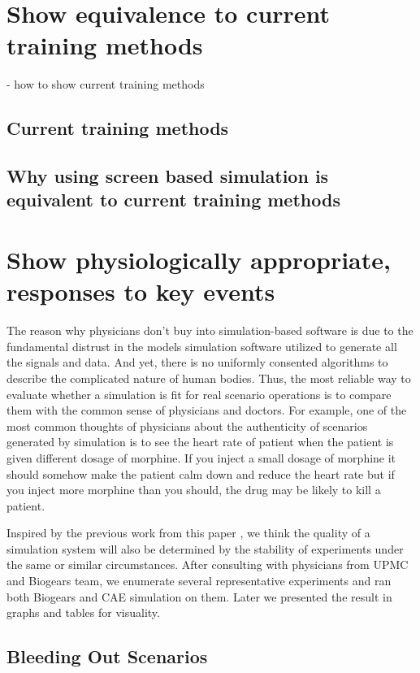 \documentclass[a4paper]{article}
\begin{document}
\section{Show equivalence to current training methods}

- how to show current training methods

\subsection{Current training methods}
\subsection{Why using screen based simulation is equivalent to current training methods}

\section{Show physiologically appropriate, responses to key events}

The reason why physicians don't buy into simulation-based software is due to the fundamental distrust in the models simulation software utilized to generate all the signals and data. And yet, there is no uniformly consented algorithms to describe the complicated nature of human bodies. Thus, the most reliable way to evaluate whether a simulation is fit for real scenario operations is to compare them with the common sense of physicians and doctors. For example, one of the most common thoughts of physicians about the authenticity of scenarios generated by simulation is to see the heart rate of patient when the patient is given different dosage of morphine. If you inject a small dosage of morphine it should somehow make the patient calm down and reduce the heart rate but if you inject more morphine than you should, the drug may be likely to kill a patient. 

Inspired by the previous work from this paper \cite{measure_repeatability}, we think the quality of a simulation system will also be determined by the stability of experiments under the same or similar circumstances. After consulting with physicians from UPMC and Biogears team, we enumerate several representative experiments and ran both Biogears and CAE simulation on them. Later we presented the result in graphs and tables for visuality.

\subsection{Bleeding Out Scenarios}
\end{document}

